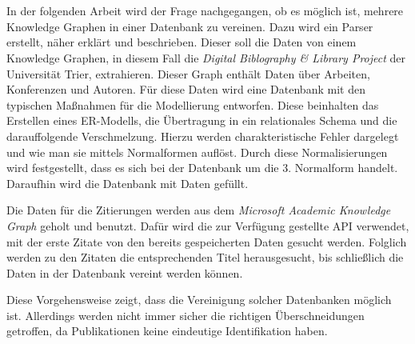 \section*{}



In der folgenden Arbeit wird der Frage nachgegangen, ob es möglich ist, mehrere Knowledge Graphen in einer Datenbank zu vereinen. Dazu wird ein Parser erstellt, näher erklärt und beschrieben. Dieser soll die Daten von einem Knowledge Graphen, in diesem Fall die\textit{ Digital Biblography \& Library Project} der Universität Trier, extrahieren. Dieser Graph enthält Daten über Arbeiten, Konferenzen und Autoren. Für diese Daten wird eine Datenbank mit den typischen Maßnahmen für die Modellierung entworfen. Diese beinhalten das Erstellen eines ER-Modells, die Übertragung in ein relationales Schema und die darauffolgende Verschmelzung. Hierzu werden charakteristische Fehler dargelegt und wie man sie mittels Normalformen auflöst. Durch diese Normalisierungen wird festgestellt, dass es sich bei der Datenbank um die 3. Normalform handelt. Daraufhin wird die Datenbank mit Daten gefüllt.

Die Daten für die Zitierungen werden aus dem \textit{Microsoft Academic Knowledge Graph} geholt und benutzt. Dafür wird die zur Verfügung gestellte API verwendet, mit der erste Zitate von den bereits gespeicherten Daten gesucht werden. Folglich werden zu den Zitaten die entsprechenden Titel herausgesucht, bis schließlich die Daten in der Datenbank vereint werden können. 

Diese Vorgehensweise zeigt, dass die Vereinigung solcher Datenbanken möglich ist. Allerdings werden nicht immer sicher die richtigen Überschneidungen getroffen, da Publikationen keine eindeutige Identifikation haben. 


